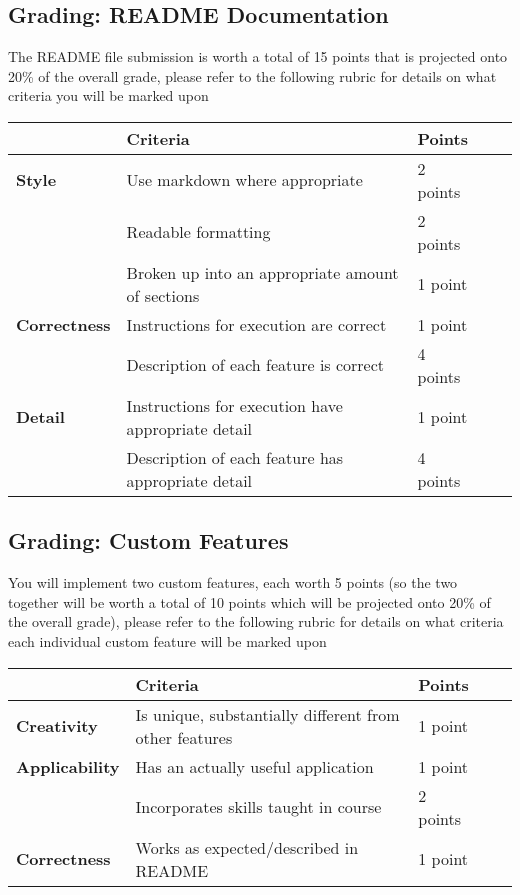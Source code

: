 \documentclass[11pt]{article}
\begin{document}
\subsection{Grading: README Documentation}
\label{sec:org6a8f307}
The README file submission is worth a total of {\color{purple}15 points}
that is projected onto {\color{purple}20\% of the overall grade}, please
refer to the following rubric for details on what criteria you will be marked
upon

\begin{center}
\begin{tabular}{|l|l|l|l|l|}
 & \textbf{Criteria} & \textbf{Points}\\
\hline
\textbf{Style} & Use markdown where appropriate & 2 points\\
 & Readable formatting & 2 points\\
 & Broken up into an appropriate amount of sections & 1 point\\
\hline
\textbf{Correctness} & Instructions for execution are correct & 1 point\\
 & Description of each feature is correct & 4 points\\
\hline
\textbf{Detail} & Instructions for execution have appropriate detail & 1 point\\
 & Description of each feature has appropriate detail & 4 points\\
\end{tabular}
\end{center}

\subsection{Grading: Custom Features}
\label{sec:org43b3325}
You will implement two custom features, each worth {\color{purple}5 points} (so the
two together will be worth a total of {\color{purple}10 points} which
will be projected onto {\color{purple}20\% of the overall grade}), please
refer to the following rubric for details on what criteria each individual
custom feature will be marked upon

\begin{center}
\begin{tabular}{|l|l|l|l|l|}
 & \textbf{Criteria} & \textbf{Points}\\
\hline
\textbf{Creativity} & Is unique, substantially different from other features & 1 point\\
\hline
\textbf{Applicability} & Has an actually useful application & 1 point\\
 & Incorporates skills taught in course & 2 points\\
\hline
\textbf{Correctness} & Works as expected/described in README & 1 point\\
\end{tabular}
\end{center}
\end{document}
